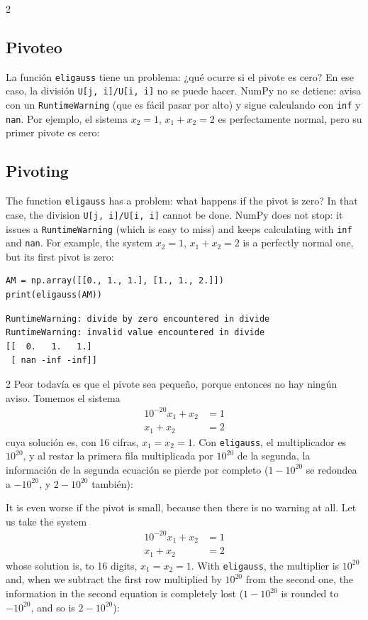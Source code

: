 \begin{paracol}{2}
\subsection{Pivoteo}\label{sec:pivoteo}
La función \texttt{eligauss} tiene un problema: ¿qué ocurre si el pivote es cero? En ese caso, la división \texttt{U[j, i]/U[i, i]} no se puede hacer. NumPy no se detiene: avisa con un \texttt{RuntimeWarning} (que es fácil pasar por alto) y sigue calculando con \texttt{inf} y \texttt{nan}. Por ejemplo, el sistema $x_2=1$, $x_1+x_2=2$ es perfectamente normal, pero su primer pivote es cero:

\switchcolumn
\subsection{Pivoting}\label{sec:pivoteo-2}
The function \texttt{eligauss} has a problem: what happens if the pivot is zero? In that case, the division \texttt{U[j, i]/U[i, i]} cannot be done. NumPy does not stop: it issues a \texttt{RuntimeWarning} (which is easy to miss) and keeps calculating with \texttt{inf} and \texttt{nan}. For example, the system $x_2=1$, $x_1+x_2=2$ is a perfectly normal one, but its first pivot is zero:
\end{paracol}

\begin{verbatim}
AM = np.array([[0., 1., 1.], [1., 1., 2.]])
print(eligauss(AM))
\end{verbatim}
\begin{verbatim}
RuntimeWarning: divide by zero encountered in divide
RuntimeWarning: invalid value encountered in divide
[[  0.   1.   1.]
 [ nan -inf -inf]]
\end{verbatim}

\begin{paracol}{2}
Peor todavía es que el pivote sea pequeño, porque entonces no hay ningún aviso. Tomemos el sistema
\begin{align*}
10^{-20}x_1+x_2&=1\\
x_1+x_2&=2
\end{align*}
cuya solución es, con 16 cifras, $x_1=x_2=1$. Con \texttt{eligauss}, el multiplicador es $10^{20}$, y al restar la primera fila multiplicada por $10^{20}$ de la segunda, la información de la segunda ecuación se pierde por completo ($1-10^{20}$ se redondea a $-10^{20}$, y $2-10^{20}$ también):

\switchcolumn
It is even worse if the pivot is small, because then there is no warning at all. Let us take the system
\begin{align*}
10^{-20}x_1+x_2&=1\\
x_1+x_2&=2
\end{align*}
whose solution is, to 16 digits, $x_1=x_2=1$. With \texttt{eligauss}, the multiplier is $10^{20}$ and, when we subtract the first row multiplied by $10^{20}$ from the second one, the information in the second equation is completely lost ($1-10^{20}$ is rounded to $-10^{20}$, and so is $2-10^{20}$):
\end{paracol}

